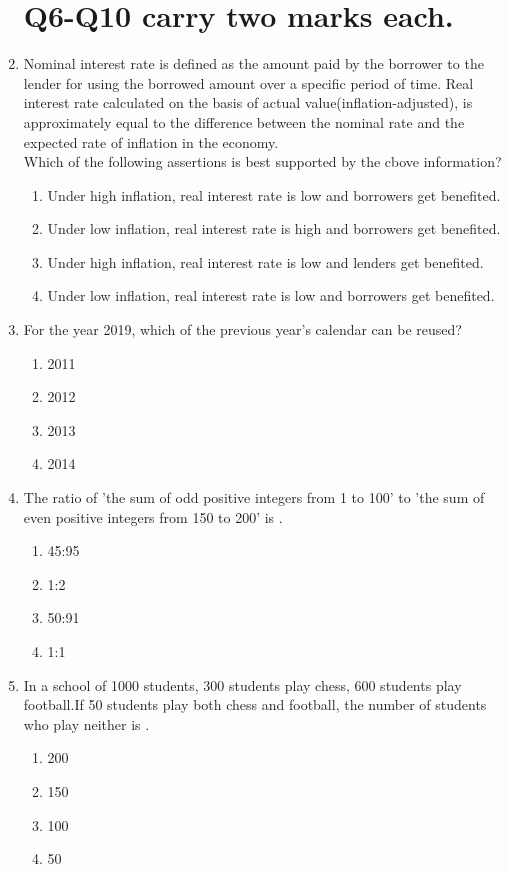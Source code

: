 \documentclass[journal,12pt,onecolumn]{IEEEtran}
\theoremstyle{remark}
\begin{document}
\begin{enumerate}
\section*{Q6-Q10 carry two marks each.}
    \item Nominal interest rate is defined as the amount paid by the borrower to the lender for using the borrowed amount over a specific period of time. Real interest rate calculated on the basis  of actual value(inflation-adjusted), is approximately equal to the difference between the nominal rate and the expected rate of inflation in the economy.\\ Which of the following assertions is best supported by the cbove information?
    \begin{enumerate}
        \item Under high inflation, real interest rate is low and borrowers get benefited.
        \item Under low inflation, real interest rate is high and borrowers get benefited.
        \item Under high inflation, real interest rate is low and lenders get benefited.
        \item Under low inflation, real interest rate is low and borrowers get benefited.
    \end{enumerate}

    \item For the year 2019, which of the previous year's calendar can be reused?
    \begin{enumerate}
        \item 2011
        \item 2012
        \item 2013
        \item 2014
    \end{enumerate}

    \item The ratio of 'the sum of odd positive integers from 1 to 100' to 'the sum of even positive integers from 150 to 200' is {\underline{\hspace{2cm}}}.
    \begin{enumerate}
        \item 45:95
        \item 1:2
        \item 50:91
        \item 1:1
    \end{enumerate}

    \item In a school of 1000 students, 300 students play chess, 600 students play football.If 50 students play both chess and football, the number of students who play neither is {\underline{\hspace{2cm}}}.
    \begin{enumerate}
        \item 200
        \item 150
        \item 100
        \item 50
    \end{enumerate}


\end{enumerate}
\end{document}
